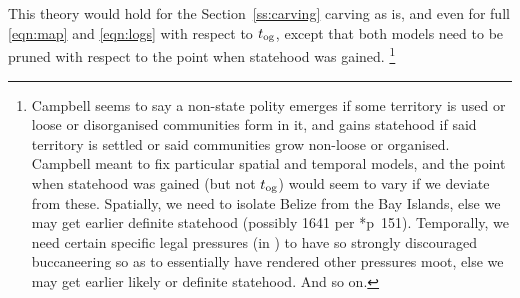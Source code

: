 		This theory would hold for the Section~\ref{ss:carving} carving as is, and even for full \ref{eqn:map} and \ref{eqn:logs} with respect to \(t_{\operatorname{og}}\), except that both models need to be pruned with respect to the point when statehood was gained.%
		\footnote{Campbell seems to say a non-state polity emerges if some territory is used or loose or disorganised communities form in it, and gains statehood if said territory is settled or said communities grow non-loose or organised. Campbell meant to fix particular spatial and temporal models, and the point when statehood was gained (but not \(t_{\operatorname{og}}\)) would seem to vary if we deviate from these. Spatially, we need to isolate Belize from the Bay Islands, else we may get earlier definite statehood (possibly 1641 per \cite{cam11}*{p~151}). Temporally, we need certain specific legal pressures (in ) to have so strongly discouraged buccaneering so as to essentially have rendered other pressures moot, else we may get earlier likely or definite statehood. And so on.}

